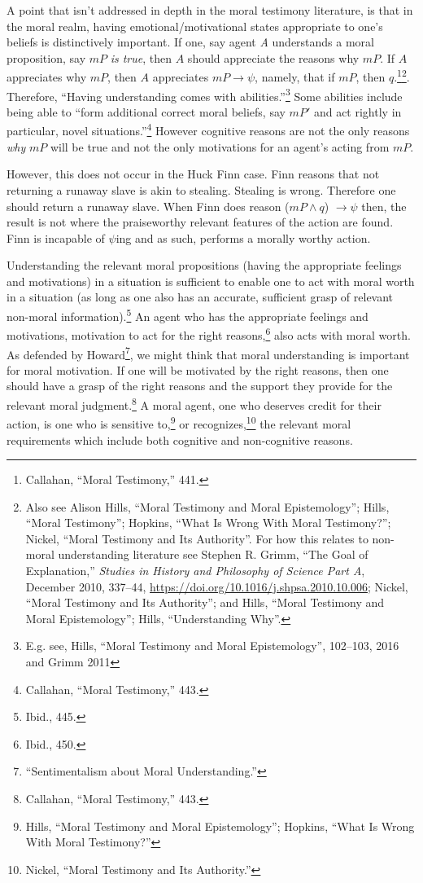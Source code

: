 \documentclass[phdthesis,12pt,final,a4paper]{wuthesis}
\theoremstyle{definition}
\theoremstyle{definition}
\theoremstyle{definition}
\theoremstyle{definition}
\theoremstyle{remark}
\begin{document}
A point that isn't addressed in depth in the moral testimony literature, is that in the moral realm, having emotional/motivational states appropriate to one's beliefs is distinctively important. If one, say agent \emph{A} understands a moral proposition, say \(mP\) \emph{is true}, then \(A\) should appreciate the reasons why \(mP\). If \(A\) appreciates why \(mP\), then \(A\) appreciates \(mP \rightarrow \psi\), namely, that if \(mP\), then \(q\).\footnote{Callahan, {``Moral {Testimony},''} 441.}\footnote{Also see Alison Hills, {``Moral Testimony and Moral Epistemology''}; Hills, {``Moral {Testimony}''}; Hopkins, {``What {Is Wrong With Moral Testimony}?''}; Nickel, {``Moral {Testimony} and Its {Authority}''}. For how this relates to non-moral understanding literature see Stephen R. Grimm, {``The Goal of Explanation,''} \emph{Studies in History and Philosophy of Science Part A}, December 2010, 337--44, \url{https://doi.org/10.1016/j.shpsa.2010.10.006}; Nickel, {``Moral {Testimony} and Its {Authority}''}; and Hills, {``Moral Testimony and Moral Epistemology''}; Hills, {``Understanding {Why}''}.}. Therefore, ``Having understanding comes with abilities.''\footnote{E.g. see, Hills, {``Moral Testimony and Moral Epistemology''}, 102--103, 2016 and Grimm 2011} Some abilities include being able to ``form additional correct moral beliefs, say \(mP'\) and act rightly in particular, novel situations.''\footnote{Callahan, {``Moral {Testimony},''} 443.} However cognitive reasons are not the only reasons \emph{why} \(mP\) will be true and not the only motivations for an agent's acting from \(mP\).

However, this does not occur in the Huck Finn case. Finn reasons that not returning a runaway slave is akin to stealing. Stealing is wrong. Therefore one should return a runaway slave. When Finn does reason (\(mP \land q\)) \(\rightarrow \psi\) then, the result is not where the praiseworthy relevant features of the action are found. Finn is incapable of \(\psi\)ing and as such, performs a morally worthy action.

Understanding the relevant moral propositions (having the appropriate feelings and motivations) in a situation is sufficient to enable one to act with moral worth in a situation (as long as one also has an accurate, sufficient grasp of relevant non-moral information).\footnote{Ibid., 445.} An agent who has the appropriate feelings and motivations, motivation to act for the right reasons,\footnote{Ibid., 450.} also acts with moral worth. As defended by Howard\footnote{{``Sentimentalism about {Moral Understanding}.''}}, we might think that moral understanding is important for moral motivation. If one will be motivated by the right reasons, then one should have a grasp of the right reasons and the support they provide for the relevant moral judgment.\footnote{Callahan, {``Moral {Testimony},''} 443.} A moral agent, one who deserves credit for their action, is one who is sensitive to,\footnote{Hills, {``Moral Testimony and Moral Epistemology''}; Hopkins, {``What {Is Wrong With Moral Testimony}?''}} or recognizes,\footnote{Nickel, {``Moral {Testimony} and Its {Authority}.''}} the relevant moral requirements which include both cognitive and non-cognitive reasons.
\end{document}

